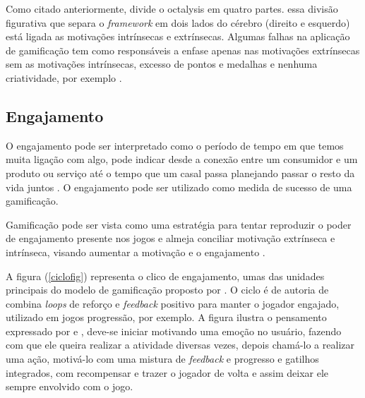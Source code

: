 Como citado anteriormente, \cite{chou2015actionable} divide o octalysis em quatro partes. essa divisão figurativa que separa o \textit{framework} em dois lados do cérebro (direito e esquerdo) está ligada as motivações intrínsecas e extrínsecas. Algumas falhas na aplicação de gamificação tem como responsáveis a enfase apenas nas motivações extrínsecas sem as motivações intrínsecas, excesso de pontos e medalhas e nenhuma criatividade, por exemplo \cite{maican2016interactivia}.

\subsection{Engajamento}

O engajamento pode ser interpretado como o período de tempo em que temos muita ligação com algo, pode indicar desde a conexão entre um consumidor e um produto ou serviço até o tempo que um casal passa planejando passar o resto da vida juntos \cite{zichermann2011gamification}. O engajamento pode ser utilizado como medida de sucesso de uma gamificação. 

Gamificação pode ser vista como uma estratégia para tentar reproduzir o poder de engajamento presente nos jogos \cite{filsecker2014multilevel} e almeja conciliar motivação extrínseca e intrínseca, visando aumentar a motivação e o engajamento \cite{muntean2011raising}. 


A figura (\ref{ciclofig}) representa o clico de engajamento, umas das unidades principais do modelo de gamificação proposto por \cite{kumar2013gamification}. O ciclo é de autoria de \cite{amy} combina \textit{loops} de reforço e \textit{feedback} positivo para manter o jogador engajado, utilizado em jogos progressão, por exemplo. A figura ilustra o pensamento expressado por \cite{amy} e \cite{kumar2013gamification}, deve-se iniciar motivando uma emoção no usuário, fazendo com que ele queira realizar a atividade diversas vezes, depois chamá-lo a realizar uma ação, motivá-lo com uma mistura de \textit{feedback} e progresso e gatilhos integrados, com recompensar e trazer o jogador de volta e assim deixar ele sempre envolvido com o jogo. 


